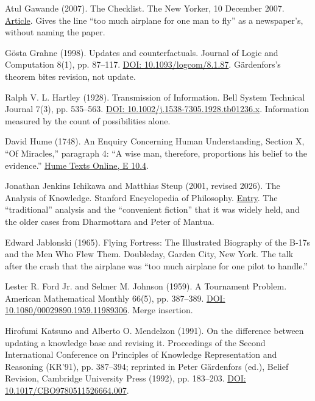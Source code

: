 \documentclass[11pt,twoside]{article}
\theoremstyle{thielethm}
\theoremstyle{thieledef}
\theoremstyle{thieledef}
\theoremstyle{thieledef}
\theoremstyle{thielethm}
\theoremstyle{thieleobs}
\theoremstyle{thielethm}
\begin{document}
\noindent Atul Gawande (2007). The Checklist. The New Yorker, 10 December 2007. \href{https://www.newyorker.com/magazine/2007/12/10/the-checklist}{Article}. Gives the line ``too much airplane for one man to fly'' as a newspaper's, without naming the paper.
\par\medskip

\noindent G\"osta Grahne (1998). Updates and counterfactuals. Journal of Logic and Computation 8(1), pp. 87--117. \href{https://doi.org/10.1093/logcom/8.1.87}{DOI: 10.1093/logcom/8.1.87}. G\"ardenfors's theorem bites revision, not update.
\par\medskip

\noindent Ralph V. L. Hartley (1928). Transmission of Information. Bell System Technical Journal 7(3), pp. 535--563. \href{https://doi.org/10.1002/j.1538-7305.1928.tb01236.x}{DOI: 10.1002/j.1538-7305.1928.tb01236.x}. Information measured by the count of possibilities alone.
\par\medskip

\noindent David Hume (1748). An Enquiry Concerning Human Understanding, Section X, ``Of Miracles,'' paragraph 4: ``A wise man, therefore, proportions his belief to the evidence.'' \href{https://davidhume.org/texts/e/10}{Hume Texts Online, E 10.4}.
\par\medskip

\noindent Jonathan Jenkins Ichikawa and Matthias Steup (2001, revised 2026). The Analysis of Knowledge. Stanford Encyclopedia of Philosophy. \href{https://plato.stanford.edu/entries/knowledge-analysis/}{Entry}. The ``traditional'' analysis and the ``convenient fiction'' that it was widely held, and the older cases from Dharmottara and Peter of Mantua.
\par\medskip

\noindent Edward Jablonski (1965). Flying Fortress: The Illustrated Biography of the B-17s and the Men Who Flew Them. Doubleday, Garden City, New York. The talk after the crash that the airplane was ``too much airplane for one pilot to handle.''
\par\medskip

\noindent Lester R. Ford Jr. and Selmer M. Johnson (1959). A Tournament Problem. American Mathematical Monthly 66(5), pp. 387--389. \href{https://doi.org/10.1080/00029890.1959.11989306}{DOI: 10.1080/00029890.1959.11989306}. Merge insertion.
\par\medskip

\noindent Hirofumi Katsuno and Alberto O. Mendelzon (1991). On the difference between updating a knowledge base and revising it. Proceedings of the Second International Conference on Principles of Knowledge Representation and Reasoning (KR'91), pp. 387--394; reprinted in Peter G\"ardenfors (ed.), Belief Revision, Cambridge University Press (1992), pp. 183--203. \href{https://doi.org/10.1017/CBO9780511526664.007}{DOI: 10.1017/CBO9780511526664.007}.
\par\medskip
\end{document}
